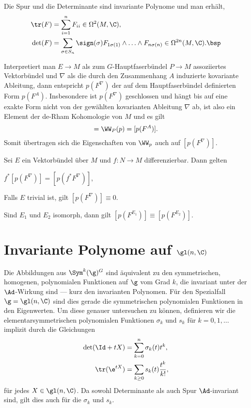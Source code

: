 \documentclass[%
	paper=a5,%
	fleqn,%
	DIV=18,%
	BCOR=0mm,
	fontsize=11pt,
	titlepage=false,%
	bibliography=totoc,
	DIV=18,%
	twoside=true,
	pdftitle=Riemannsche Geometrie,
	pdfauthor=Uwe Semmelmann,
	numbers=noendperiod]%
	{scrbook}
\begin{document}
\begin{ex}
Die Spur und die Determinante sind invariante Polynome und man erhält,
\begin{align*}
\tr(F) &= \sum_{i=1}^n F_{ii} \in \Omega^2(M,\C),\\
\det(F) &= \sum_{\sigma\in S_n} \sign(\sigma) F_{1\sigma(1)}\wedge \ldots
\wedge F_{n\sigma(n)} \in \Omega^{2n}(M,\C).\bsp
\end{align*} 
\end{ex}


Interpretiert man $E\to M$ als zum
$G$-Hauptfaserbündel $P\to M$  assoziiertes Vektorbündel und $\nabla$ als die
durch den Zusammenhang $A$ induzierte kovariante Ableitung, dann entspricht  $p(F^\nabla)$ der auf dem Hauptfaserbündel definierten
Form $p(F^A)$. Insbesondere ist $p(F^\nabla)$ geschlossen und hängt bis auf
eine exakte Form nicht von der gewählten kovarianten Ableitung $\nabla$ ab, ist also ein Element
der de-Rham Kohomologie von $M$ und es gilt
\begin{align*}
[p(F^\nabla)] = \WW_P(p) = [p(F^A)].
\end{align*}
Somit übertragen sich die Eigenschaften von $\WW_p$ auch auf $[p(F^\nabla)]$.

\begin{lem}
Sei $E$ ein Vektorbündel über $M$ und $f: N\to M$ differenzierbar. Dann gelten
\begin{propenum}
\item $f^*[p(F^\nabla)] = [p(f^*F^\nabla)]$,
\item Falls $E$ trivial ist, gilt $[p(F^\nabla)]\equiv 0$.
\item Sind $E_1$ und $E_2$ isomorph, dann gilt $[p(F^{E_1})] \equiv
[p(F^{E_2})]$.\fish
\end{propenum}
\end{lem}

\section{Invariante Polynome auf $\gl(n,\C)$}

Die Abbildungen aus $\Sym^k(\g)^G$ sind äquivalent zu den symmetrischen,
homogenen, polynomialen Funktionen auf $\g$ vom Grad $k$, die invariant unter
der $\Ad$-Wirkung sind --- kurz den invarianten Polynomen. Für den Spezialfall
$\g=\gl(n,\C)$ sind dies gerade die symmetrischen polynomialen
Funktionen in den Eigenwerten. Um diese genauer untersuchen zu können,
definieren wir die elementarsymmetrischen polynomialen Funktionen $\sigma_k$
und $s_k$ für $k=0,1,\ldots$ implizit durch die Gleichungen
\begin{align*}
\det(\Id + tX) &= \sum_{k=0}^n \sigma_k(t) t^k,\\
\tr(\e^{tX}) &= \sum_{k\ge 0} s_k(t)\frac{t^k}{k!},
\end{align*}
für jedes $X\in \gl(n,\C)$. Da sowohl Determinante als auch Spur $\Ad$-invariant
sind, gilt dies auch für die $\sigma_k$ und $s_k$.
\end{document}
